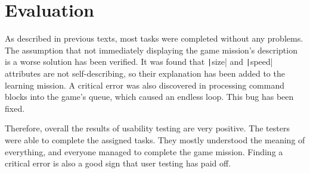 \section{Evaluation}

As described in previous texts, most tasks were completed without any problems.
The assumption that not immediately displaying the game mission's description is a worse solution has been verified.
It was found that \texttt|size| and \texttt|speed| attributes are not self-describing, so their explanation has been added to the learning mission.
A critical error was also discovered in processing command blocks into the game's queue, which caused an endless loop.
This bug has been fixed.

Therefore, overall the results of usability testing are very positive.
The testers were able to complete the assigned tasks.
They mostly understood the meaning of everything, and everyone managed to complete the game mission.
Finding a critical error is also a good sign that user testing has paid off.
